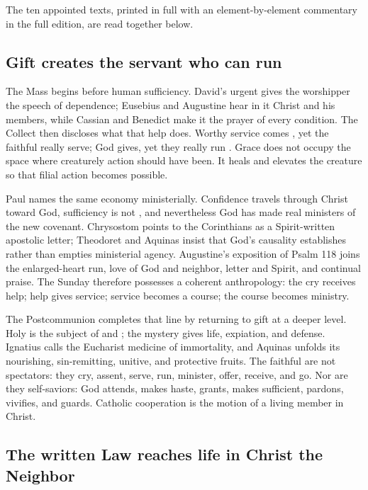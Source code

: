 The ten appointed texts, printed in full with an element-by-element
commentary in the full edition, are read together below.

\subsection*{Gift creates the servant who can run \enspace{}}

The Mass begins before human sufficiency. David's urgent
 gives the worshipper the speech of dependence;
Eusebius and Augustine hear in it Christ and his members, while Cassian and
Benedict make it the prayer of every condition. The Collect then discloses
what that help does. Worthy service comes , yet the
faithful really serve; God gives, yet they really run
. Grace does not occupy the space where creaturely
action should have been. It heals and elevates the creature so that filial
action becomes possible.

Paul names the same economy ministerially. Confidence travels through Christ
toward God, sufficiency is not , and nevertheless God
has made real ministers of the new covenant. Chrysostom points to the
Corinthians as a Spirit-written apostolic letter; Theodoret and Aquinas insist
that God's causality establishes rather than empties ministerial agency.
Augustine's exposition of Psalm 118 joins the enlarged-heart run, love of God
and neighbor, letter and Spirit, and continual praise. The Sunday therefore
possesses a coherent anthropology: the cry receives help; help gives service;
service becomes a course; the course becomes ministry.

The Postcommunion completes that line by returning to gift at a deeper level.
Holy  is the subject of  and
; the mystery gives life, expiation, and defense. Ignatius calls
the Eucharist medicine of immortality, and Aquinas unfolds its nourishing,
sin-remitting, unitive, and protective fruits. The faithful are not spectators:
they cry, assent, serve, run, minister, offer, receive, and go. Nor are they
self-saviors: God attends, makes haste, grants, makes sufficient, pardons,
vivifies, and guards. Catholic cooperation is the motion of a living member in
Christ.

\subsection*{The written Law reaches life in Christ the Neighbor \enspace{}}

